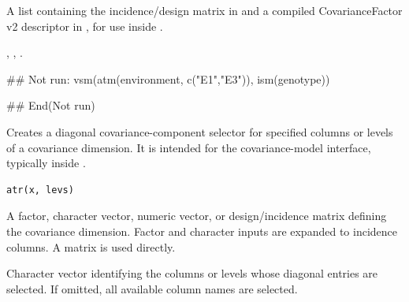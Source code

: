 \documentclass[a4paper]{book}
\begin{document}
%
\begin{Value}
A list containing the incidence/design matrix in  and a compiled CovarianceFactor v2 descriptor in , for use inside .
\end{Value}
%
\begin{SeeAlso}\relax
{}, , .
\end{SeeAlso}
%
\begin{Examples}
\begin{ExampleCode}
## Not run: 
vsm(atm(environment, c("E1","E3")), ism(genotype))

## End(Not run)
\end{ExampleCode}
\end{Examples}
%
\begin{Description}\relax
Creates a diagonal covariance-component selector for specified columns or levels of a covariance dimension. It is intended for the  covariance-model interface, typically inside .
\end{Description}
%
\begin{Usage}
\begin{verbatim}
atr(x, levs)
\end{verbatim}
\end{Usage}
%
\begin{Arguments}
\begin{ldescription}
\item[\code{x}] 
A factor, character vector, numeric vector, or design/incidence matrix defining the covariance dimension. Factor and character inputs are expanded to incidence columns. A matrix is used directly.

\item[\code{levs}] 
Character vector identifying the columns or levels whose diagonal entries are selected. If omitted, all available column names are selected.

\end{ldescription}
\end{Arguments}
%
\end{document}
